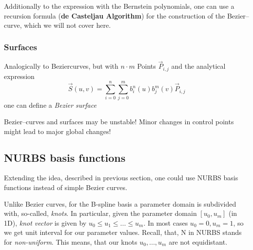 Additionally to the expression with the Bernstein polynomials, one can use a recursion formula (\textbf{de Casteljau Algorithm}) for the construction of the Bezier--curve, which we will not cover here.
\subsubsection{Surfaces}
Analogically to Beziercurves, but with $n\cdot m$ Points $\vec{P}_{i,j}$ and the analytical expression
\begin{equation*}
\vec{S}(u,v)=\sum\limits_{i=0}^n \sum\limits_{j=0}^m b_i^n(u) b_j^m(v) \vec{P}_{i,j}
\end{equation*}
one can define a \textit{Bezier surface}
\\
\begin{mdframed}
Bezier--curves and surfaces may be unstable! Minor changes in control points might lead to major global changes!
\end{mdframed}


\subsection{NURBS basis functions}
Extending the idea, described in previous section, one could use NURBS basis functions instead of simple Bezier curves. 

Unlike Bezier curves, for the B-spline basis a parameter domain is subdivided with, so-called, \textit{knots}. In particular, given the parameter domain $[u_{0}, u_{m}]$ (in 1D), \textit{knot vector} is given by $u_{0} \leq u_{1} \leq ... \leq u_{m}$. In most cases $u_{0} = 0, u_{m} = 1$, so we get unit interval for our parameter values. Recall, that, N in NURBS stands for \textit{non-uniform}. This means, that our knots $u_{0},..., u_{m}$ are not equidistant.

